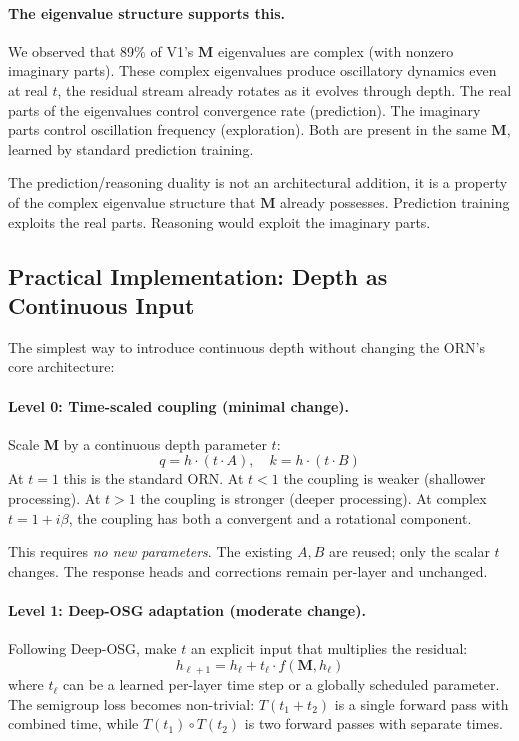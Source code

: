 \documentclass[11pt, a4paper]{article}
\newcommand{\M}{\mathbf{M}}
\theoremstyle{plain}
\theoremstyle{remark}
\begin{document}
\paragraph{The eigenvalue structure supports this.}
We observed that 89\% of V1's $\M$ eigenvalues are complex (with nonzero imaginary parts).
These complex eigenvalues produce oscillatory dynamics even at real $t$, the residual stream already rotates as it evolves through depth.
The real parts of the eigenvalues control convergence rate (prediction).
The imaginary parts control oscillation frequency (exploration).
Both are present in the same $\M$, learned by standard prediction training.

The prediction/reasoning duality is not an architectural addition, it is a property of the complex eigenvalue structure that $\M$ already possesses.
Prediction training exploits the real parts.
Reasoning would exploit the imaginary parts.

\subsection{Practical Implementation: Depth as Continuous Input}

The simplest way to introduce continuous depth without changing the ORN's core architecture:

\paragraph{Level 0: Time-scaled coupling (minimal change).}
Scale $\M$ by a continuous depth parameter $t$:
\[
q = h \cdot (t \cdot A), \quad k = h \cdot (t \cdot B)
\]
At $t = 1$ this is the standard ORN.
At $t < 1$ the coupling is weaker (shallower processing).
At $t > 1$ the coupling is stronger (deeper processing).
At complex $t = 1 + i\beta$, the coupling has both a convergent and a rotational component.

This requires \emph{no new parameters}.
The existing $A, B$ are reused; only the scalar $t$ changes.
The response heads and corrections remain per-layer and unchanged.

\paragraph{Level 1: Deep-OSG adaptation (moderate change).}
Following Deep-OSG, make $t$ an explicit input that multiplies the residual:
\[
h_{\ell+1} = h_\ell + t_\ell \cdot f(\M, h_\ell)
\]
where $t_\ell$ can be a learned per-layer time step or a globally scheduled parameter.
The semigroup loss becomes non-trivial: $T(t_1 + t_2)$ is a single forward pass with combined time, while $T(t_1) \circ T(t_2)$ is two forward passes with separate times.
\end{document}
